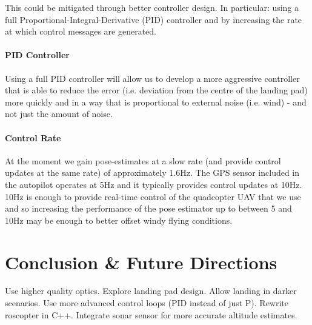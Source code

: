 \documentclass[10pt]{scrartcl} %
\begin{document}
This could be mitigated through better controller design. In particular: using a full Proportional-Integral-Derivative (PID) controller and by increasing the rate at which control messages are generated.

\paragraph{PID Controller}
Using a full PID controller will allow us to develop a more aggressive controller that is able to reduce the error (i.e. deviation from the centre of the landing pad) more quickly and in a way that is proportional to external noise (i.e. wind) - and not just the amount of noise.

\paragraph{Control Rate}
At the moment we gain pose-estimates at a slow rate (and provide control updates at the same rate) of approximately 1.6Hz. The GPS sensor included in the autopilot operates at 5Hz and it typically provides control updates at 10Hz. 10Hz is enough to provide real-time control of the quadcopter UAV that we use and so increasing the performance of the pose estimator up to between 5 and 10Hz may be enough to better offset windy flying conditions.

\section{Conclusion \& Future Directions}

Use higher quality optics.
Explore landing pad design.
Allow landing in darker scenarios.
Use more advanced control loops (PID instead of just P).
Rewrite roscopter in C++.
Integrate sonar sensor for more accurate altitude estimates.

\printbibliography
\end{document}
